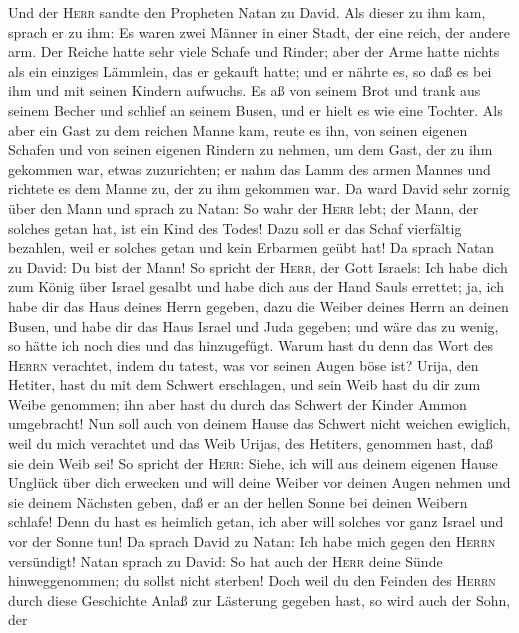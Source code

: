  Und der \textsc{Herr} sandte den Propheten Natan zu
David. Als dieser zu ihm kam, sprach er zu ihm: Es waren zwei Männer in
einer Stadt, der eine reich, der andere arm.  Der Reiche
hatte sehr viele Schafe und Rinder;  aber der Arme hatte
nichts als ein einziges Lämmlein, das er gekauft hatte; und er nährte
es, so daß es bei ihm und mit seinen Kindern aufwuchs. Es aß von seinem
Brot und trank aus seinem Becher und schlief an seinem Busen, und er
hielt es wie eine Tochter.  Als aber ein Gast zu dem
reichen Manne kam, reute es ihn, von seinen eigenen Schafen und von
seinen eigenen Rindern zu nehmen, um dem Gast, der zu ihm gekommen war,
etwas zuzurichten; er nahm das Lamm des armen Mannes und richtete es dem
Manne zu, der zu ihm gekommen war.  Da ward David sehr
zornig über den Mann und sprach zu Natan: So wahr der \textsc{Herr}
lebt; der Mann, der solches getan hat, ist ein Kind des Todes!
 Dazu soll er das Schaf vierfältig bezahlen, weil er
solches getan und kein Erbarmen geübt hat!  Da sprach
Natan zu David: Du bist der Mann! So spricht der \textsc{Herr}, der Gott
Israels: Ich habe dich zum König über Israel gesalbt und habe dich aus
der Hand Sauls errettet;  ja, ich habe dir das Haus deines
Herrn gegeben, dazu die Weiber deines Herrn an deinen Busen, und habe
dir das Haus Israel und Juda gegeben; und wäre das zu wenig, so hätte
ich noch dies und das hinzugefügt.  Warum hast du denn das
Wort des \textsc{Herrn} verachtet, indem du tatest, was vor seinen Augen
böse ist? Urija, den Hetiter, hast du mit dem Schwert erschlagen, und
sein Weib hast du dir zum Weibe genommen; ihn aber hast du durch das
Schwert der Kinder Ammon umgebracht!  Nun soll auch von
deinem Hause das Schwert nicht weichen ewiglich, weil du mich verachtet
und das Weib Urijas, des Hetiters, genommen hast, daß sie dein Weib sei!
 So spricht der \textsc{Herr}: Siehe, ich will aus deinem
eigenen Hause Unglück über dich erwecken und will deine Weiber vor
deinen Augen nehmen und sie deinem Nächsten geben, daß er an der hellen
Sonne bei deinen Weibern schlafe!  Denn du hast es
heimlich getan, ich aber will solches vor ganz Israel und vor der Sonne
tun!  Da sprach David zu Natan: Ich habe mich gegen den
\textsc{Herrn} versündigt! Natan sprach zu David: So hat auch der
\textsc{Herr} deine Sünde hinweggenommen; du sollst nicht sterben!
 Doch weil du den Feinden des \textsc{Herrn} durch diese
Geschichte Anlaß zur Lästerung gegeben hast, so wird auch der Sohn, der
